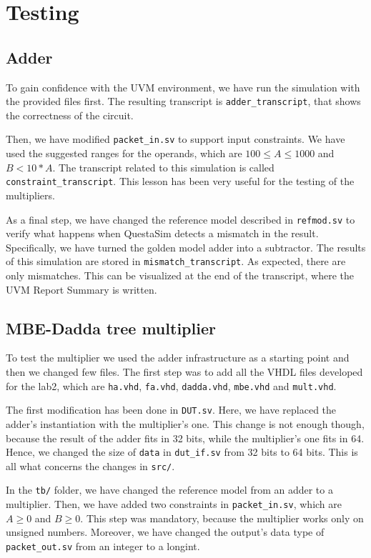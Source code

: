 \chapter{Testing}

\section{Adder}
To gain confidence with the UVM environment, we have run the simulation with the provided files first.
The resulting transcript is \verb|adder_transcript|, that shows the correctness of the circuit.

Then, we have modified \verb|packet_in.sv| to support input constraints. We have used the suggested
ranges for the operands, which are $100 \leq A \leq 1000$ and $B < 10*A$. The transcript related to this
simulation is called \verb|constraint_transcript|. This lesson has been very useful for the testing
of the multipliers.

As a final step, we have changed the reference model described in \verb|refmod.sv| to verify what happens
when QuestaSim detects a mismatch in the result. Specifically, we have turned the golden model adder into a
subtractor. The results of this simulation are stored in \verb|mismatch_transcript|. As expected, there are
only mismatches. This can be visualized at the end of the transcript, where the UVM Report Summary is written.

\section{MBE-Dadda tree multiplier}
To test the multiplier we used the adder infrastructure as a starting point and then we changed few files.
The first step was to add all the VHDL files developed for the lab2, which are \verb|ha.vhd|, \verb|fa.vhd|,
\verb|dadda.vhd|, \verb|mbe.vhd| and \verb|mult.vhd|.

The first modification has been done in \verb|DUT.sv|. Here, we have replaced the adder's instantiation with
the multiplier's one. This change is not enough though, because the result of the adder fits in 32 bits, while
the multiplier's one fits in 64. Hence, we changed the size of \verb|data| in \verb|dut_if.sv| from 32 bits to
64 bits. This is all what concerns the changes in \verb|src/|.

In the \verb|tb/| folder, we have changed the reference model from an adder to a multiplier. Then, we have added
two constraints in \verb|packet_in.sv|, which are $A \geq 0$ and $B \geq 0$. This step was mandatory, because
the multiplier works only on unsigned numbers. Moreover, we have changed the output's data type of \verb|packet_out.sv|
from an integer to a longint.

